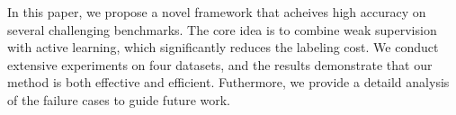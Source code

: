 In this paper, we propose a novel framework that acheives high accuracy on several challenging benchmarks. The core idea is to combine weak supervision with active learning, which significantly reduces the labeling cost. We conduct extensive experiments on four datasets, and the results demonstrate that our method is both effective and efficient. Futhermore, we provide a detaild analysis of the failure cases to guide future work.
